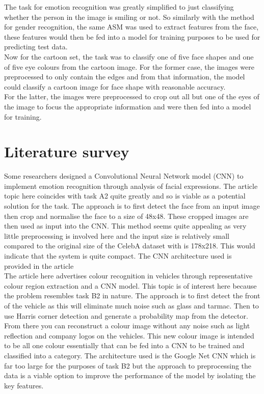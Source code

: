 \documentclass{article}
\begin{document}
    The task for emotion recognition was greatly simplified to just classifying whether the person in the image is smiling or not. So similarly with the method for gender recognition, the same ASM was used to extract features from the face, these features would then be fed into a model for training purposes to be used for predicting test data.\\
    
    Now for the cartoon set, the task was to classify one of five face shapes and one of five eye colours from the cartoon image. For the former case, the images were preprocessed to only contain the edges and from that information, the model could classify a cartoon image for face shape with reasonable accuracy.\\
    
    For the latter, the images were preprocessed to crop out all but one of the eyes of the image to focus the appropriate information and were then fed into a model for training.
\section{Literature survey}
\label{sec:lite}
    Some researchers \cite{8942386} designed a Convolutional Neural Network model (CNN) to implement emotion recognition through analysis of facial expressions. The article topic here coincides with task A2 quite greatly and so is viable as a potential solution for the task. The approach is to first detect the face from an input image then crop and normalise the face to a size of 48x48. These cropped images are then used as input into the CNN. This method seems quite appealing as very little preprocessing is involved here and the input size is relatively small compared to the original size of the CelebA dataset with is 178x218. This would indicate that the system is quite compact. The CNN architecture used is provided in the article \cite{8942386}\\
    
	The article here \cite{8436710} advertises colour recognition in vehicles through representative colour region extraction and a CNN model. This topic is of interest here because the problem resembles task B2 in nature. The approach is to first detect the front of the vehicle as this will eliminate much noise such as glass and tarmac. Then to use Harris corner detection and generate a probability map from the detector. From there you can reconstruct a colour image without any noise such as light reflection and company logos on the vehicles. This new colour image is intended to be all one colour essentially that can be fed into a CNN to be trained and classified into a category. The architecture used is the Google Net CNN which is far too large for the purposes of task B2 but the approach to preprocessing the data is a viable option to improve the performance of the model by isolating the key features. \\
	
\end{document}
